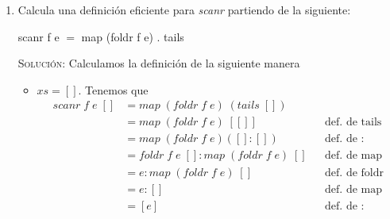 \documentclass[letterpaper,11pt]{article}
\begin{document}
\begin{enumerate}
\begin{itemize}
\begin{proof}
            que pueden ser verificadas fácilmente
            \begin{itemize}
                \item $Tree = Void$. Se cumple ya que 
                \begin{align*}
                    foldT \; f \; v \; Void &= v
                    && \text{def. de foldT}
                \end{align*}
                
                \item $Tree = (Node \; t1 \; r \; t2)$. Se cumple ya que 
                \begin{align*}
                    foldT \; f \; v \; (Node \; t1 \; r \; t2)
                    &= f \; t1' \; r \; t2'
                    && \text{definición de foldT} \\
                    &= f \; (foldT \; f \; v \; t1) \; r \; 
                    (foldT \; f \; v \; t2)
                    && \text{definición de $t1'$ y $t2'$}
                \end{align*}
            \end{itemize}
            
            con lo que quedan demostradas las dos precondiciones. Aplicando 
            la propiedad universal queda demostrada la propiedad original.
            
        \end{proof}

    \end{itemize}

    \item Calcula una definición eficiente para \textit{scanr} partiendo de la
    siguiente:
    \begin{center}
        scanr f e $=$ map (foldr f e) . tails
    \end{center}
    
    \textsc{Solución:} Calculamos la definición de la siguiente manera
    \begin{itemize}
        \item $xs = []$. Tenemos que 
        \begin{align*}
            scanr \; f \; e \; [] 
            &= map \; (foldr \; f \; e) \; (tails \; []) \\
            &= map \; (foldr \; f \; e) \; [[]]
            && \text{def. de tails} \\ 
            &= map \; (foldr \; f \; e) ([]:[])
            && \text{def. de $:$} \\
            &= foldr \; f \; e \; [] : map \; (foldr \; f \; e) \; []
            && \text{def. de map} \\ 
            &= e : map \; (foldr \; f \; e) \; []
            && \text{def. de foldr} \\ 
            &= e : []
            && \text{def. de map} \\
            &= [e]
            && \text{def. de $:$}
        \end{align*}
        

\end{itemize}
\end{enumerate}
\end{document}
